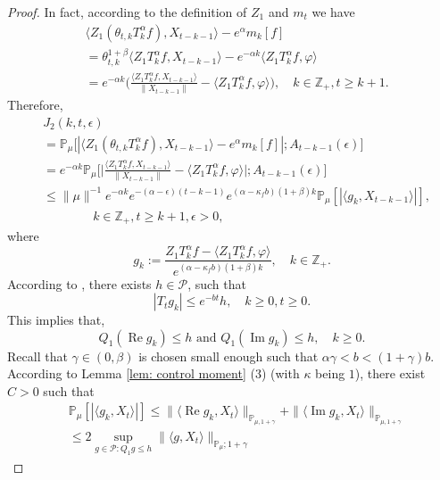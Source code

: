\documentclass[12pt,oneside,english]{amsart}
\theoremstyle{plain}
\theoremstyle{definition}
\numberwithin{equation}{section}
\begin{document}
\begin{proof}
    In fact, according to the definition of $Z_1$ and $m_t$ we have
    \begin{align}
          &\langle Z_1(\theta_{t,k}T_k^{\alpha}f),X_{t-k-1}\rangle-e^{\alpha}m_k[f]
          \\&= \theta_{t,k}^{1+\beta} \langle Z_1T_k^{\alpha}f,X_{t-k-1}\rangle - e^{-\alpha k}\langle  Z_1T_k^{\alpha}f,\varphi\rangle
          \\&=e^{-\alpha k}\Big(\frac{\langle Z_1T_k^{\alpha}f ,X_{t-k-1}\rangle}{\|X_{t-k-1}\|}-\langle  Z_1T_k^{\alpha}f ,\varphi\rangle\Big),
          \quad k\in \mathbb Z_+, t\geq k+1.
    \end{align}
Therefore,
\begin{align}
\label{eq: prevJ2}
&J_2(k,t,\epsilon)
	\\&= \mathbb P_\mu\big[|\langle Z_1(\theta_{t,k}T_k^{\alpha}f),X_{t-k-1}\rangle-e^{\alpha}m_k[f]|;A_{t-k-1}(\epsilon)\big]
    \\&=e^{-\alpha k}\mathbb{P}_{\mu}\bigg[\Big|\frac{\langle Z_1T^{\alpha}_k f,X_{t-k-1}\rangle}{\|X_{t-k-1}\|}-\langle  Z_1T^{\alpha}_k f,\varphi\rangle\Big|;A_{t-k-1}(\epsilon)\bigg]\nonumber\\
    &\leq \|\mu\|^{-1} e^{-\alpha k}e^{-(\alpha-\epsilon)(t-k-1)}e^{(\alpha-\kappa_f b)(1+\beta)k} \mathbb{P}_{\mu}\left[\left|\langle g_k,X_{t-k-1}\rangle\right|\right],
    \\&\qquad\qquad k\in \mathbb Z_+, t\geq k+1, \epsilon > 0,
\end{align}
where
\[
g_k
	:= \frac{Z_1 T^{\alpha}_k f-\langle  Z_1T^{\alpha}_k f,\varphi\rangle}{e^{(\alpha-\kappa_f b)(1+\beta)k}},
	\quad k \in \mathbb Z_+.
\]
According to \cite[Lemma 2.8]{MM}, there exists $h \in \mathcal P$, such that
\[
     |T_t g_k|\leq e^{-bt}h,
     \quad k\geq 0,t\geq 0.
\]
 	This implies that,
 \[
 	Q_1 (\operatorname{Re} g_k) \leq h
 	\text{ and } Q_1 (\operatorname{Im} g_k)\leq h,
 	\quad k \geq 0.
 \]
	Recall that $\gamma\in(0,\beta)$ is chosen small enough such that $\alpha \gamma < b < (1+\gamma)b$.
	According to Lemma \ref{lem: control moment} (3) (with $\kappa$ being $1$), there exist $C>0$ such that
\begin{align}
    &\mathbb{P}_{\mu}\left[\left|\langle g_k,X_{t}\rangle\right|\right]
    \leq \|\langle \operatorname{Re} g_k, X_{t}\rangle\|_{\mathbb{P}_{\mu,1+\gamma}} + \|\langle \operatorname{Im} g_k, X_{t}\rangle\|_{\mathbb{P}_{\mu,1+\gamma}}
    \\& \leq 2\sup_{g\in \mathcal P: Q_1 g\leq h} \|\langle g, X_t\rangle\|_{\mathbb P_\mu; 1+\gamma}

\end{align}
\end{proof}
\end{document}
